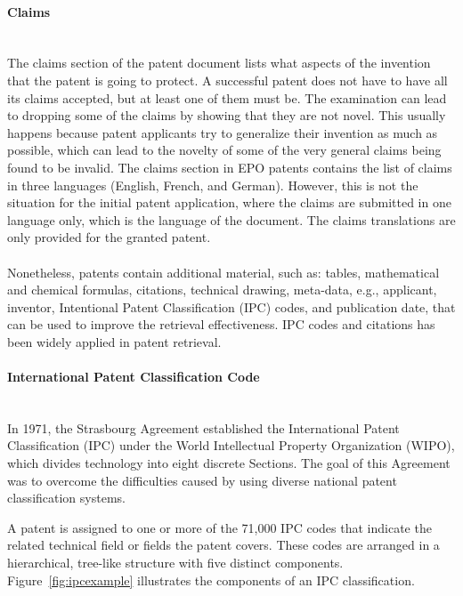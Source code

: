 \paragraph{Claims}
\ \\ 
The claims section of the patent document lists what aspects of the invention that the patent is
going to protect. A successful patent does not have to have all its claims accepted, but at least one
of them must be. The examination can lead to dropping some of the claims by showing that they
are not novel. This usually happens because patent applicants try to generalize their invention as
much as possible, which can lead to the novelty of some of the very general claims being found to
be invalid.
The claims section in EPO patents contains the list of claims in three languages (English,
French, and German). However, this is not the situation for the initial patent application, where
the claims are submitted in one language only, which is the language of the document. The
claims translations are only provided for the granted patent.\\\\
Nonetheless, patents contain
additional material, such as: tables, mathematical and chemical formulas, citations,
technical drawing, meta-data, e.g., applicant, inventor, Intentional Patent Classification 
(IPC) codes, and publication date, that can be used to improve the retrieval effectiveness.
IPC codes and citations has been widely applied in patent retrieval. 
\paragraph{International Patent Classification Code}
\ \\ 
In 1971, the Strasbourg Agreement established the International Patent Classification (IPC) under the World Intellectual Property Organization (WIPO), which divides technology into eight discrete Sections. The goal of this
Agreement was to overcome the difficulties caused by using diverse national patent classification systems.~\citep{harris2010comparison}

A patent is assigned to one or more of the 71,000 IPC codes that 
indicate the related technical field or fields the patent covers. 
These codes are arranged in a hierarchical, tree-like structure with 
five distinct components. Figure~\ref{fig:ipcexample} illustrates the components of an IPC classification.

